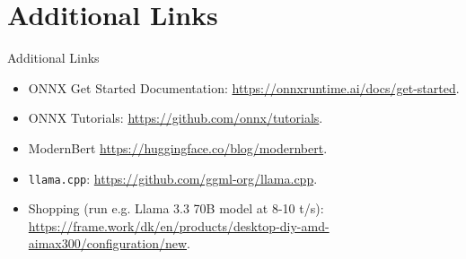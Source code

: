 \documentclass[aspectratio=169, xcolor=dvipsnames, handout]{beamer} %
\begin{document}
\section{Additional Links}
\begin{frame}{Additional Links}
\pause
 \begin{itemize}
  \item  ONNX Get Started Documentation: \url{https://onnxruntime.ai/docs/get-started}. \pause
  \item ONNX Tutorials: \url{https://github.com/onnx/tutorials}. \pause
  \item ModernBert \url{https://huggingface.co/blog/modernbert}. \pause
  \item \texttt{llama.cpp}: \url{https://github.com/ggml-org/llama.cpp}. \pause
  \item Shopping (run e.g. Llama 3.3 70B model at 8-10 t/s): \url{https://frame.work/dk/en/products/desktop-diy-amd-aimax300/configuration/new}.
 \end{itemize}

\end{frame}
\end{document}
